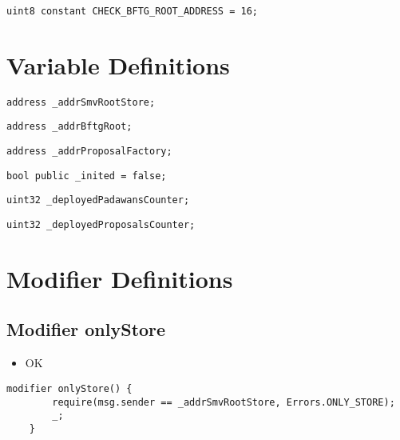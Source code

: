 \begin{lstlisting}[firstnumber=40]
    uint8 constant CHECK_BFTG_ROOT_ADDRESS = 16;
\end{lstlisting}

\section{Variable Definitions}

\begin{lstlisting}[firstnumber=55]
    address _addrSmvRootStore;
\end{lstlisting}

\begin{lstlisting}[firstnumber=56]
    address _addrBftgRoot;
\end{lstlisting}

\begin{lstlisting}[firstnumber=57]
    address _addrProposalFactory;
\end{lstlisting}

\begin{lstlisting}[firstnumber=91]
    bool public _inited = false;
\end{lstlisting}

\begin{lstlisting}[firstnumber=132]
    uint32 _deployedPadawansCounter;
\end{lstlisting}

\begin{lstlisting}[firstnumber=141]
    uint32 _deployedProposalsCounter;
\end{lstlisting}

\section{Modifier Definitions}


\subsection{Modifier onlyStore}


\begin{itemize}
\item OK
\end{itemize}

\begin{lstlisting}[firstnumber=59]
    modifier onlyStore() {
        require(msg.sender == _addrSmvRootStore, Errors.ONLY_STORE);
        _;
    }
\end{lstlisting}

